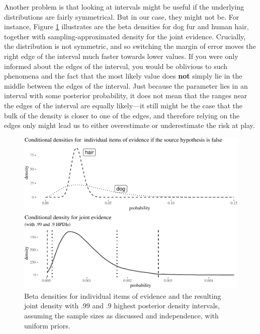 \documentclass[
  10pt,
  dvipsnames,enabledeprecatedfontcommands]{scrartcl}
\begin{document}
Another problem is that looking at intervals might be useful if the
underlying distributions are fairly symmetrical. But in our case, they
might not be. For instance, Figure \ref{fig:densities} illustrates are
the beta densities for dog fur and human hair, together with
sampling-approximated density for the joint evidence.
Crucially, the distribution is not symmetric, and so switching the
margin of error moves the right edge of the interval much faster towards
lower values. If you were only informed about the edges of the interval,
you would be oblivious to such phenomena and the fact that the most
likely value does \textbf{not} simply lie in the middle between the
edges of the interval. Just because the parameter lies in an interval
with some posterior probability, it does not mean that the ranges near
the edges of the interval are equally likely---it still might be the
case that the bulk of the density is closer to one of the edges, and
therefore relying on the edges only might lead us to either overestimate
or underestimate the risk at play.

\begin{figure}[H]

\begin{center}\includegraphics[width=0.8\linewidth]{chapter-outline_files/figure-latex/fig:densities-1} \end{center}
\caption{Beta densities for individual items of evidence and the resulting joint density with .99 and .9 highest posterior density intervals, assuming the sample sizes as discussed and independence, with uniform priors.}
\label{fig:densities}
\end{figure}
\end{document}
